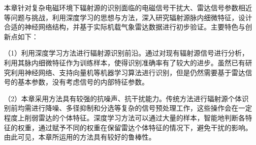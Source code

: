 本章针对复杂电磁环境下辐射源的识别面临的电磁信号干扰大、雷达信号参数相近等问题与挑战，利用深度学习的思想与方法，深入研究辐射源脉内细微特征，设计合适的神经网络结构，并基于实际机载气象雷达数据进行初步验证。主要特色与创新点如下：

（1）利用深度学习方法进行辐射源识别前沿。通过对现有辐射源信号进行分析，利用其脉内细微特征作为训练样本，使得识别准确率有了较大的进步。虽然已有研究利用神经网络、支持向量机等机器学习算法进行识别，但是仍然需要基于雷达信号的基本参数，没有考虑信号的内部特征参数。

（2）本章采用方法具有较强的抗噪声、抗干扰能力。传统方法进行辐射源个体识别前均需进行降噪、多径抑制和分选等复杂的信号预处理工作，这些操作会在一定程度上削弱雷达的个体特征。深度学习方法可以通过大量的样本，智能地判断各特征的权重，通过赋予不同的权重在保留雷达个体特征的情况下，避免干扰的影响。由此可见，本章所运用的方法具有较好的鲁棒性。


